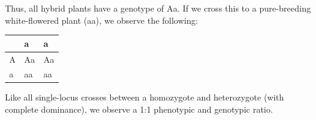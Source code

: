 \documentclass[11pt,]{article}
\begin{document}
\begin{blackbox}
Thus, all hybrid plants have a genotype of Aa. If we cross this to a
pure-breeding white-flowered plant (aa), we observe the following:

\begin{longtable}[]{@{}lll@{}}
\toprule
\begin{minipage}[b]{0.09\columnwidth}\raggedright
\strut
\end{minipage} & \begin{minipage}[b]{0.11\columnwidth}\raggedright
a\strut
\end{minipage} & \begin{minipage}[b]{0.11\columnwidth}\raggedright
a\strut
\end{minipage}\tabularnewline
\midrule
\endhead
\begin{minipage}[t]{0.09\columnwidth}\raggedright
A\strut
\end{minipage} & \begin{minipage}[t]{0.11\columnwidth}\raggedright
Aa\strut
\end{minipage} & \begin{minipage}[t]{0.11\columnwidth}\raggedright
Aa\strut
\end{minipage}\tabularnewline
\begin{minipage}[t]{0.09\columnwidth}\raggedright
a\strut
\end{minipage} & \begin{minipage}[t]{0.11\columnwidth}\raggedright
aa\strut
\end{minipage} & \begin{minipage}[t]{0.11\columnwidth}\raggedright
aa\strut
\end{minipage}\tabularnewline
\bottomrule
\end{longtable}

Like all single-locus crosses between a homozygote and heterozygote
(with complete dominance), we observe a 1:1 phenotypic and genotypic
ratio.

\end{blackbox}
\end{document}
